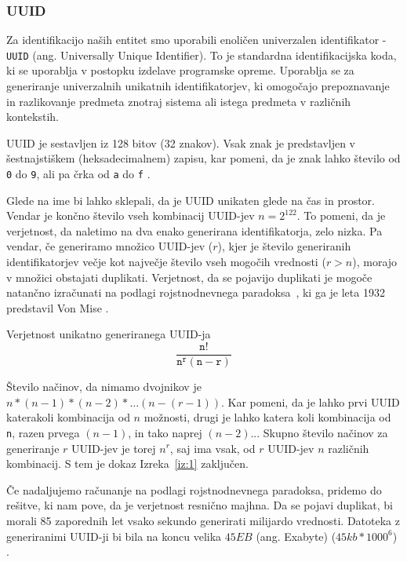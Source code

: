 \subsubsection{UUID}
Za identifikacijo naših entitet smo uporabili enoličen univerzalen identifikator - \verb=UUID= (ang. Universally Unique Identifier). To je standardna identifikacijska koda, ki se uporablja v postopku izdelave programske opreme. Uporablja se za generiranje univerzalnih unikatnih identifikatorjev, ki omogočajo prepoznavanje in razlikovanje predmeta znotraj sistema ali istega predmeta v različnih kontekstih.

UUID je sestavljen iz 128 bitov (32 znakov). Vsak znak je predstavljen v šestnajstiškem (heksadecimalnem) zapisu, kar pomeni, da je znak lahko število od \verb=0= do \verb=9=, ali pa črka od \verb=a= do \verb=f= \cite{uuid-rfc}.

Glede na ime bi lahko sklepali, da je UUID unikaten glede na čas in prostor. Vendar je končno število vseh kombinacij UUID-jev $n=2^{122}$. To pomeni, da je verjetnost, da naletimo na dva enako generirana identifikatorja, zelo nizka.
Pa vendar, če generiramo množico UUID-jev ($r$), kjer je število generiranih identifikatorjev večje kot največje število vseh mogočih vrednosti ($r > n$), morajo v množici obstajati duplikati. Verjetnost, da se pojavijo duplikati je mogoče natančno izračunati na podlagi rojstnodnevnega paradoksa~\cite{birthday-problem-what-is}, ki ga je leta 1932 predstavil Von Mise \cite{birthday-problem-inventor}.

\begin{izrek}
\label{iz:1}
Verjetnost unikatno generiranega UUID-ja
\begin{equation}
\mathtt{\frac{n!}{n^{r}(n-r)}}
\label{eq:1}
\end{equation}
\end{izrek}

\begin{dokaz}
Število načinov, da nimamo dvojnikov je $n*(n-1)*(n-2)* …(n-(r-1))$. Kar pomeni, da je lahko prvi UUID katerakoli kombinacija od $n$ možnosti, drugi je lahko katera koli kombinacija od \verb=n=, razen prvega $(n-1)$, in tako naprej $(n-2)$... Skupno število načinov za generiranje $r$ UUID-jev je torej $n^r$, saj ima vsak, od $r$ UUID-jev $n$ različnih kombinacij.
S tem je dokaz Izreka~\ref{iz:1} zaključen.
\end{dokaz}

Če nadaljujemo računanje na podlagi rojstnodnevnega paradoksa, pridemo do rešitve, ki nam pove, da je verjetnost resnično majhna. Da se pojavi duplikat, bi morali 85 zaporednih let vsako sekundo generirati milijardo vrednosti. Datoteka z generiranimi UUID-ji bi bila na koncu velika $45EB$ (ang. Exabyte) ($45kb*1000^6$) \cite{uuid-collisions}.



